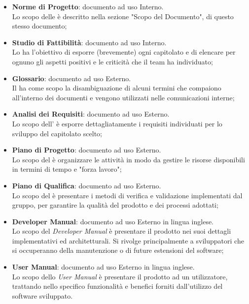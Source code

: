 	\begin{itemize}
		\item \textbf{Norme di Progetto}:
		documento ad uso Interno.\\
		Lo scopo delle \textit{\NdP{}} è descritto nella sezione  "Scopo del Documento", di questo stesso documento;

		\item \textbf{Studio di Fattibilità}:
		documento ad uso Interno.\\
		Lo \textit{\SdF{}} ha l'obiettivo di esporre (brevemente) ogni capitolato e di elencare per ognuno gli aspetti positivi e le criticità che il team ha individuato;

		\item \textbf{Glossario}:
		documento ad uso Esterno.\\
		Il \Glossario{}  ha come scopo la disambiguazione di alcuni termini che compaiono all'interno dei documenti e vengono utilizzati nelle comunicazioni interne;

		\item \textbf{Analisi dei Requisiti}:
		documento ad uso Esterno.\\
		Lo  scopo  dell'\textit{\AdR{}} è esporre dettagliatamente i requisiti individuati per lo sviluppo del capitolato scelto;

		\item \textbf{Piano di Progetto}:
		documento ad uso Esterno.\\
		Lo scopo del \textit{\PdP{}} è organizzare le attività in modo da gestire le risorse disponibili in termini di tempo e "forza lavoro";

		\item \textbf{Piano di Qualifica}:
		documento ad uso Esterno.\\
		Lo scopo del \textit{\PdQ{}} è presentare i metodi di verifica e validazione implementati dal gruppo, per garantire la qualità del prodotto e dei processi adottati;

		\item \textbf{Developer Manual}:
		documento ad uso Esterno in lingua inglese.\\
		Lo scopo del \textit{Developer Manual} è presentare il prodotto nei suoi dettagli implementativi ed architetturali. Si rivolge principalmente a sviluppatori che si occuperanno della manutenzione o di future estensioni del software;

		\item \textbf{User Manual}:
		documento ad uso Esterno in lingua inglese.\\
		Lo scopo dello \textit{User Manual} è presentare il prodotto ad un utilizzatore, trattando nello specifico funzionalità e benefici forniti dall'utilizzo del software sviluppato.

	\end{itemize}

